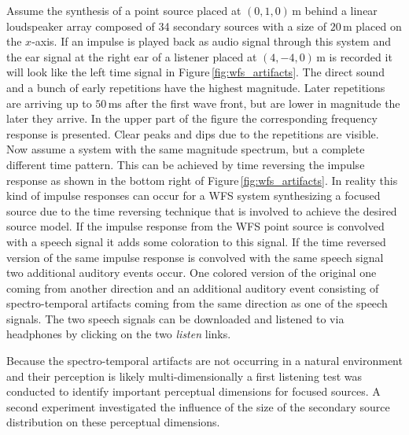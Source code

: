Assume the synthesis of a point source placed at $(0,1,0)$\,m
behind a linear loudspeaker array composed of 34 secondary sources with a size
of $20$\,m placed on the $x$-axis.
If an impulse is played back as audio signal through this system and
the ear signal at the right ear of a listener placed at $(4,-4,0)$\,m is recorded
it will look like the left time signal in Figure\,\ref{fig:wfs_artifacts}. The
direct sound and a bunch of early repetitions have the highest magnitude.
Later repetitions are arriving up to $50$\,ms after the first wave front, but
are lower in magnitude the later they arrive. In the upper part of the
figure the corresponding frequency response is
presented. Clear peaks and dips due to the repetitions are visible. Now
assume a system with the same magnitude spectrum, but a complete different time
pattern. This can be achieved by time reversing the impulse response as shown in
the bottom right of Figure\,\ref{fig:wfs_artifacts}. In reality this kind of
impulse responses can occur for a \ac{WFS} system synthesizing a focused source due
to the time reversing technique that is involved to achieve the desired source
model. If the impulse response from the \ac{WFS} point source is convolved
with a speech signal it adds some coloration to this signal. If the time
reversed version of the same impulse response is convolved with the same
speech signal two additional auditory events occur. One colored version of the
original one coming from another direction and an additional auditory event
consisting of spectro-temporal artifacts coming from the same direction as one of the speech
signals. The two speech signals can be downloaded and listened to via headphones
by clicking on the two \emph{listen} links.

\begin{figure*}[t]
    \small
    \centering
    
    \caption{Impulse response and amplitude spectrum of a point source
    synthesized by \ac{WFS}~\protect\eqref{eq:d_wfs_ps_25D}. Beside the impulse
    response its time reversed version is shown. Both impulse responses were
    convolved with a speech signal which can be downloaded via the \emph{listen}
    links.
    Parameters: $\xs = (0,1,0)$, $\xref = (4,-4,0)$\,m, linear secondary source
    distribution with a length of $20$\,m and 34 sources.
    }
    \label{fig:wfs_artifacts}
\end{figure*}

Because the spectro-temporal artifacts are not occurring in a natural environment
and their perception is likely multi-dimensionally a first listening test was
conducted to identify important perceptual dimensions for focused sources.
A second experiment investigated the influence of the size of the secondary source
distribution on these perceptual dimensions.

